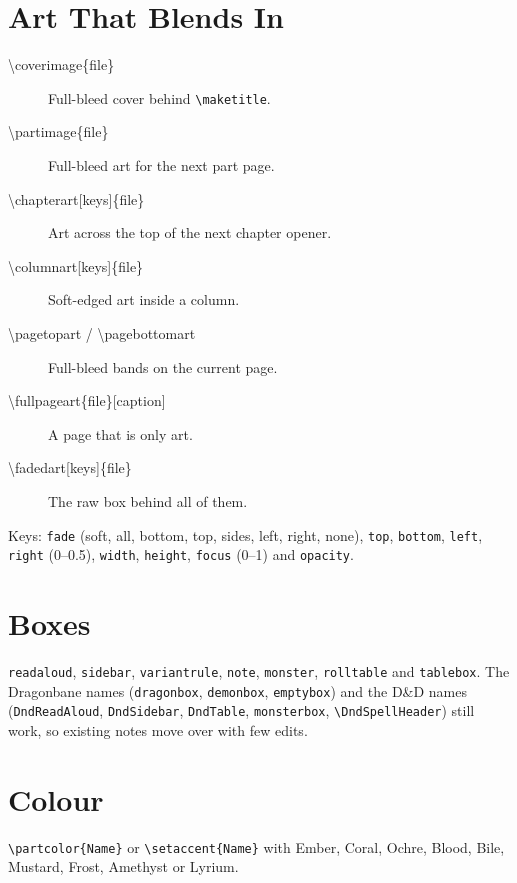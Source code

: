 \documentclass{apotheosis-book} %
\begin{document}
\begin{segment}
\section{Art That Blends In}
\begin{description}
  \item[\textbackslash coverimage\{file\}] Full-bleed cover behind \texttt{\textbackslash maketitle}.
  \item[\textbackslash partimage\{file\}] Full-bleed art for the next part page.
  \item[\textbackslash chapterart{[keys]}\{file\}] Art across the top of the next chapter opener.
  \item[\textbackslash columnart{[keys]}\{file\}] Soft-edged art inside a column.
  \item[\textbackslash pagetopart / \textbackslash pagebottomart] Full-bleed bands on the current page.
  \item[\textbackslash fullpageart\{file\}{[caption]}] A page that is only art.
  \item[\textbackslash fadedart{[keys]}\{file\}] The raw box behind all of them.
\end{description}
Keys: \texttt{fade} (soft, all, bottom, top, sides, left, right, none),
\texttt{top}, \texttt{bottom}, \texttt{left}, \texttt{right} (0--0.5),
\texttt{width}, \texttt{height}, \texttt{focus} (0--1) and \texttt{opacity}.

\section{Boxes}
\texttt{readaloud}, \texttt{sidebar}, \texttt{variantrule}, \texttt{note},
\texttt{monster}, \texttt{rolltable} and \texttt{tablebox}. The Dragonbane
names (\texttt{dragonbox}, \texttt{demonbox}, \texttt{emptybox}) and the D\&D
names (\texttt{DndReadAloud}, \texttt{DndSidebar}, \texttt{DndTable},
\texttt{monsterbox}, \texttt{\textbackslash DndSpellHeader}) still work, so
existing notes move over with few edits.

\section{Colour}
\texttt{\textbackslash partcolor\{Name\}} or \texttt{\textbackslash setaccent\{Name\}}
with Ember, Coral, Ochre, Blood, Bile, Mustard, Frost, Amethyst or Lyrium.
\end{segment}
\end{document}

